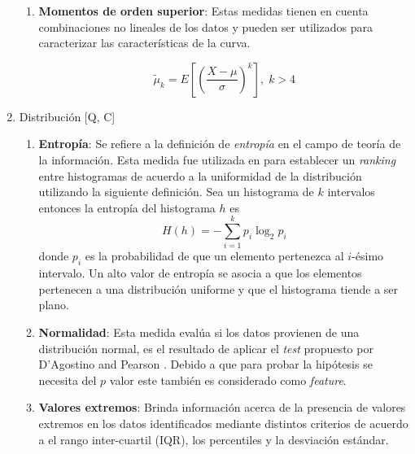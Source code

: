\documentclass[a4paper,10pt,twocolumn]{article}
\begin{document}
\begin{enumerate}
\begin{enumerate}


						
						
						\item \textbf{Momentos de orden superior}:
						Estas medidas tienen en cuenta combinaciones no lineales de los datos y pueden ser utilizados para
						caracterizar las caracter\'isticas de la curva.

						$$
						\tilde{\mu}_k = E \left[\left( \frac{X - \mu}{\sigma} \right)^k\right], \;k>4
						$$

       				
					\end{enumerate}
				\item Distribuci\'on [Q, C]
					\begin{enumerate}
						\item \textbf{Entrop\'ia}: Se refiere a la definici\'on de \textit{entrop\'ia} en el campo de teor\'ia de la informaci\'on. Esta medida
						fue utilizada en \cite{seo2004rank} para establecer un \textit{ranking} entre histogramas de acuerdo a la uniformidad de la distribuci\'on
						utilizando la siguiente definici\'on. Sea un histograma de $k$ intervalos entonces la entrop\'ia del histograma $h$ es
						$$H(h) = -\sum_{i=1}^{k}{p_i \log_2{p_i}}$$ donde $p_i$ es la probabilidad de que un elemento pertenezca al $i$-\'esimo intervalo. 
						Un alto valor de entrop\'ia se asocia a que los elementos pertenecen a una distribuci\'on uniforme y que el histograma tiende a ser plano.

						\item \textbf{Normalidad}: Esta medida eval\'ua si los datos provienen de una distribuci\'on normal,
						es el resultado de aplicar el \textit{test} propuesto por D’Agostino and Pearson \cite{diagostino1971omnibus}.
						Debido a que para probar la hip\'otesis se necesita del $p$ valor este tambi\'en es considerado como
						\textit{feature}.

						\item \textbf{Valores extremos}: Brinda informaci\'on acerca de la presencia de valores\\ extremos
						en los datos identificados mediante distintos criterios de acuerdo a el rango inter-cuartil (IQR), los percentiles y la
						desviaci\'on est\'andar.
					\end{enumerate}
				

			\end{enumerate}
\end{document}
